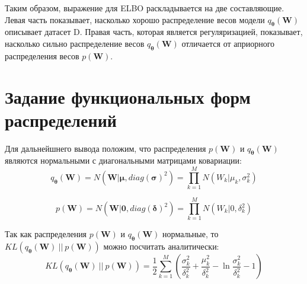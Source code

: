 \documentclass{article}
\numberwithin{equation}{section}
\begin{document}
    Таким образом, выражение для ELBO раскладывается на две составляющие.
    Левая часть показывает, насколько хорошо распределение весов модели
    $q_{\pmb{\theta}}(\pmb{W})$ описывает датасет D.
    Правая часть, которая является регуляризацией, показывает, насколько сильно распределение весов
    $q_{\pmb{\theta}}(\pmb{W})$ отличается от априорного распределения
    весов $p(\pmb{W})$.

    \section{Задание функциональных форм распределений}

    Для дальнейшнего вывода положим,
    что распределения $p(\pmb{W})$ и $q_{\pmb{\theta}}(\pmb{W})$
    являются нормальными с диагональными матрицами ковариации:
    \begin{equation}
        q_{\pmb{\theta}}(\pmb{W})
        =
            N(
                \pmb{W} | \pmb{\mu}, diag(\pmb{\sigma})^{2}
            )
        =
            \prod_{k=1}^M
            N(
                W_k | \mu_k, \sigma_k^2
            )
    \end{equation}

    \begin{equation}
        p(\pmb{W})
        =
            N(
                \pmb{W} | \pmb{0}, diag(\pmb{\delta})^{2}
            )
        =
            \prod_{k=1}^M
            N(
                W_k | 0, \delta_k^2
            )
    \end{equation}

    Так как распределения $p(\pmb{W})$ и $q_{\pmb{\theta}}(\pmb{W})$ нормальные, то
    $KL(q_{\pmb{\theta}}(\pmb{W})~||~p(\pmb{W}))$
    можно посчитать аналитически:
    \begin{equation}\label{kl_init}
        KL(
            q_{\pmb{\theta}}(\pmb{W})~||~p(\pmb{W})
        )
        =
            \frac{1}{2}\sum_{k=1}^{M}(
                \frac
                    {\sigma_{k}^2}
                    {\delta_{k}^2}
                +
                \frac
                    {\mu_{k}^2}
                    {\delta_{k}^2}
                -
                \ln{
                    \frac
                        {\sigma_{k}^2}
                        {\delta_{k}^2}
                }
                - 1
            )
    \end{equation}
\end{document}
